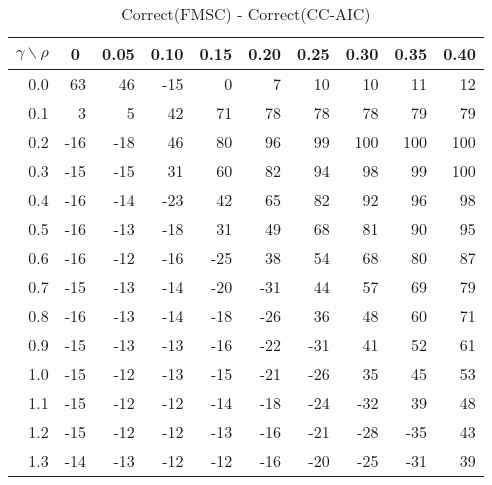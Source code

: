 \documentclass[12pt]{article}
\begin{document}
\begin{table}[!tbp]
\caption{Correct(FMSC) - Correct(CC-AIC)}
 \begin{center}
 \begin{tabular}{r|rrrrrrrrr}\hline\hline
\multicolumn{1}{c|}{$\gamma\backslash\rho$}&\multicolumn{1}{c}{0}&\multicolumn{1}{c}{0.05}&\multicolumn{1}{c}{0.10}&\multicolumn{1}{c}{0.15}&\multicolumn{1}{c}{0.20}&\multicolumn{1}{c}{0.25}&\multicolumn{1}{c}{0.30}&\multicolumn{1}{c}{0.35}&\multicolumn{1}{c}{0.40}\tabularnewline
\hline


0.0& 63& 46&-15&  0&  7& 10& 10& 11& 12\tabularnewline
0.1&  3&  5& 42& 71& 78& 78& 78& 79& 79\tabularnewline
0.2&-16&-18& 46& 80& 96& 99&100&100&100\tabularnewline
0.3&-15&-15& 31& 60& 82& 94& 98& 99&100\tabularnewline
0.4&-16&-14&-23& 42& 65& 82& 92& 96& 98\tabularnewline
0.5&-16&-13&-18& 31& 49& 68& 81& 90& 95\tabularnewline
0.6&-16&-12&-16&-25& 38& 54& 68& 80& 87\tabularnewline
0.7&-15&-13&-14&-20&-31& 44& 57& 69& 79\tabularnewline
0.8&-16&-13&-14&-18&-26& 36& 48& 60& 71\tabularnewline
0.9&-15&-13&-13&-16&-22&-31& 41& 52& 61\tabularnewline
1.0&-15&-12&-13&-15&-21&-26& 35& 45& 53\tabularnewline
1.1&-15&-12&-12&-14&-18&-24&-32& 39& 48\tabularnewline
1.2&-15&-12&-12&-13&-16&-21&-28&-35& 43\tabularnewline
1.3&-14&-13&-12&-12&-16&-20&-25&-31& 39\tabularnewline
\hline
\end{tabular}

\end{center}

\end{table}

%
\end{document}
